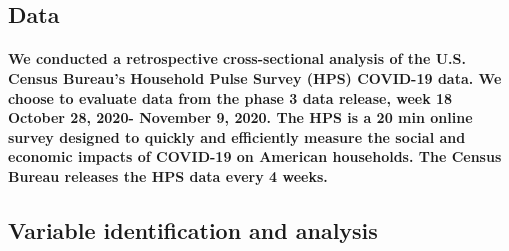 \documentclass[
  12pt,
]{article}
\begin{document}
\hypertarget{data}{%
\subsection{Data}\label{data}}

\hypertarget{we-conducted-a-retrospective-cross-sectional-analysis-of-the-u.s.-census-bureaus-household-pulse-survey-hps-covid-19-data.-we-choose-to-evaluate-data-from-the-phase-3-data-release-week-18-october-28-2020--november-9-2020.-the-hps-is-a-20-min-online-survey-designed-to-quickly-and-efficiently-measure-the-social-and-economic-impacts-of-covid-19-on-american-households.-the-census-bureau-releases-the-hps-data-every-4-weeks.}{%
\paragraph{We conducted a retrospective cross-sectional analysis of the
U.S. Census Bureau's Household Pulse Survey (HPS) COVID-19 data. We
choose to evaluate data from the phase 3 data release, week 18 October
28, 2020- November 9, 2020. The HPS is a 20 min online survey designed
to quickly and efficiently measure the social and economic impacts of
COVID-19 on American households. The Census Bureau releases the HPS data
every 4
weeks.}\label{we-conducted-a-retrospective-cross-sectional-analysis-of-the-u.s.-census-bureaus-household-pulse-survey-hps-covid-19-data.-we-choose-to-evaluate-data-from-the-phase-3-data-release-week-18-october-28-2020--november-9-2020.-the-hps-is-a-20-min-online-survey-designed-to-quickly-and-efficiently-measure-the-social-and-economic-impacts-of-covid-19-on-american-households.-the-census-bureau-releases-the-hps-data-every-4-weeks.}}

\hypertarget{variable-identification-and-analysis}{%
\subsection{Variable identification and
analysis}\label{variable-identification-and-analysis}}
\end{document}
